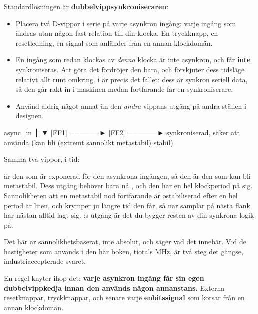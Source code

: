 Standardlösningen är \textbf{dubbelvippsynkroniseraren}:
\begin{itemize}
  \item Placera två D-vippor i serie på varje asynkron ingång: varje ingång som ändras utan någon
    fast relation till din klocka. En tryckknapp, en resetledning, en signal som anländer från en
    annan klockdomän.
  \item En ingång som redan klockas av \emph{denna} klocka är inte asynkron, och får \textbf{inte}
    synkroniseras. Att göra det fördröjer den bara, och förskjuter dess tidsläge relativt allt runt
    omkring.  i  är precis det fallet: dess  är
    synkron seriell data, så den går rakt in i maskinen medan  fortfarande får en
    synkroniserare.
  \item Använd aldrig något annat än den \emph{andra} vippans utgång på andra ställen i designen.
\end{itemize}

\begin{textdrawing}
async_in
   │
   ▼
 [FF1] ──────► [FF2] ──────► synkroniserad, säker att använda
   (kan bli       (extremt sannolikt
   metastabil)     stabil)
\end{textdrawing}

Samma två vippor, i tid:


 är den som är exponerad för den asynkrona ingången, så den är den som kan bli
metastabil. Dess utgång behöver bara nå , och den har en hel klockperiod på sig.
Sannolikheten att en metastabil nod fortfarande är ostabiliserad efter en hel period är liten, och
krymper ju längre tid den får, så när  samplar på nästa flank har  nästan
alltid lagt sig. :s utgång är det du bygger resten av din synkrona logik på.

Det här är sannolikhetsbaserat, inte absolut, och  säger vad det innebär. Vid
de hastigheter som används i den här boken, tiotals MHz, är två steg det gängse,
industriaccepterade svaret.

En regel knyter ihop det: \textbf{varje asynkron ingång får sin egen dubbelvippkedja innan den
används någon annanstans.} Externa resetknappar, tryckknappar, och senare varje
\textbf{enbitssignal} som korsar från en annan klockdomän.


